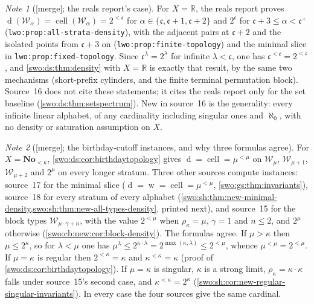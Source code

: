 \documentclass[11pt]{article}
\theoremstyle{definition}
\theoremstyle{remark}
\newtheorem{note}[note]{Note}
\newcommand{\No}{\mathbf{No}}
\newcommand{\WO}{\mathcal W}
\newcommand{\code}[1]{\texttt{\small #1}}
\newcommand{\merge}{\textsf{[merge]}}
\newcommand{\dens}{\operatorname{d}}
\newcommand{\cell}{\operatorname{cell}}
\newcommand{\weight}{\operatorname{w}}
\begin{document}
\begin{note}[\merge; the reals report's case]\label{swo:vi:note:lwo-density}
For $X=\mathbb R$, the reals report proves
$\dens(\WO_\alpha)=\cell(\WO_\alpha)=2^{<\mathfrak c}$ for
$\alpha\in\{\mathfrak c,\mathfrak c+1,\mathfrak c+2\}$ and $2^{\mathfrak c}$ for
$\mathfrak c+3\le\alpha<\mathfrak c^+$ (\code{lwo:prop:all-strata-density}), with
the adjacent pairs at $\mathfrak c+2$ and the isolated points from
$\mathfrak c+3$ on (\code{lwo:prop:finite-topology}) and the minimal slice in
\code{lwo:prop:fixed-topology}. Since $\mathfrak c^\lambda=2^\lambda$ for
infinite $\lambda<\mathfrak c$, one has $\mathfrak c^{<\mathfrak c}=2^{<\mathfrak c}$,
and \cref{swo:ds:thm:density} with $X=\mathbb R$ is exactly that result, by
the same two mechanisms (short-prefix cylinders, and the finite terminal
permutation block). Source~16 does not cite these statements; it cites the
reals report only for the set baseline (\cref{swo:ds:thm:setspectrum}). New in
source~16 is the generality: every infinite linear alphabet, of any
cardinality including singular ones and $\aleph_0$, with no density or
saturation assumption on $X$.
\end{note}

\begin{note}[\merge; the birthday-cutoff instances, and why three formulas agree]\label{swo:vi:note:instances}
For $X=\No_{<\kappa}$, \cref{swo:ds:cor:birthdaytopology} gives
$\dens=\cell=\mu^{<\mu}$ on $\WO_\mu$, $\WO_{\mu+1}$, $\WO_{\mu+2}$ and
$2^\mu$ on every longer stratum. Three other sources compute instances:
source~17 for the minimal slice ($\dens=\weight=\cell=\mu^{<\mu}$,
\cref{swo:gs:thm:invariants}), source~18 for every stratum of every alphabet
(\cref{swo:sh:thm:new-minimal-density,swo:sh:thm:new-all-types-density},
printed next), and source~15 for the block types $\WO_{\mu\cdot\gamma+n}$, with
the value $2^{<\mu}$ when $\rho_\kappa=\mu$, $\gamma=1$ and $n\le2$, and $2^\mu$
otherwise (\cref{swo:cb:new:cor:block-density}). The formulas agree. If
$\mu>\kappa$ then $\mu\le2^\kappa$, so for $\lambda<\mu$ one has
$\mu^\lambda\le2^{\kappa\cdot\lambda}=2^{\max(\kappa,\lambda)}\le2^{<\mu}$,
whence $\mu^{<\mu}=2^{<\mu}$. If $\mu=\kappa$ is regular then $2^{<\kappa}=\kappa$
and $\kappa^{<\kappa}=\kappa$ (proof of \cref{swo:ds:cor:birthdaytopology}). If
$\mu=\kappa$ is singular, $\kappa$ is a strong limit, $\rho_\kappa=\kappa\cdot\kappa$
falls under source~15's second case, and
$\kappa^{<\kappa}=2^\kappa$ (\cref{swo:sh:cor:new-regular-singular-invariants}).
In every case the four sources give the same cardinal.
\end{note}
\end{document}

